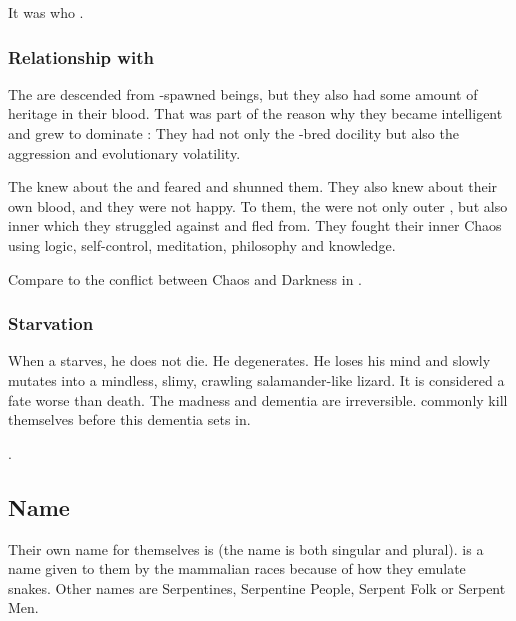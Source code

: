 It was \Sethicus who . 





\subsubsection{Relationship with \XzaiShanns}
The \ophidians{} are descended from \voyager-spawned beings, but they also had some amount of \xsic{} heritage in their blood. 
That was part of the reason why they became intelligent and grew to dominate \Miith{}: 
They had not only the \voyager-bred docility but also the \xsic{} aggression and evolutionary volatility. 

The \ophidians{} knew about the \xss{} and feared and shunned them. 
They also knew about their own \xsic{} blood, and they were not happy. 
To them, the \xss{} were not only outer \daemons, but also inner \daemons{} which they struggled against and fled from. 
They fought their inner Chaos using logic, self-control, meditation, philosophy and knowledge. 

Compare to the conflict between Chaos and Darkness in \cite{StevenEriksonIanCameronEsslemont:MalazanBookoftheFallen}. 





\subsubsection{Starvation}
When a \caisith starves, he does not die.
He degenerates.
He loses his mind and slowly mutates into a mindless, slimy, crawling salamander-like lizard. 
It is considered a fate worse than death.
The madness and dementia are irreversible. 
\Caisith commonly kill themselves before this dementia sets in. 

\Dragons {}.









\subsection{Name}
Their own name for themselves is \caisith (the name is both singular and plural). 
\quo{\Ophidian} is a name given to them by the mammalian races because of how they emulate snakes. 
Other names are Serpentines, Serpentine People, Serpent Folk or Serpent Men. 





